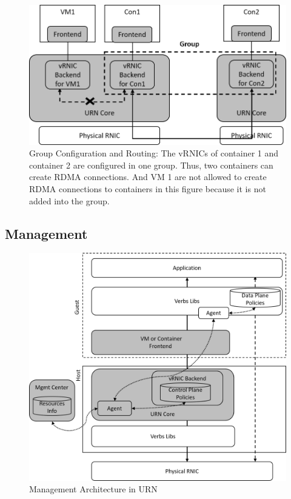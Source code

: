 \begin{figure}[!ht]
	\centering
	\includegraphics[width=1.0\linewidth]{images/route-config}
	\caption{Group Configuration and Routing: The vRNICs of container 1 and container 2 are configured in one group. Thus, two containers can create RDMA connections. And VM 1 are not allowed to create RDMA connections to containers in this figure because it is not added into the group. }
	\label{fig:route-config}
\end{figure}

\subsection{Management}

\begin{figure}[!ht]
	\centering
	\includegraphics[width=1\linewidth]{images/urn-interface.png}
	\caption{Management Architecture in URN}
	\label{fig:framework-overview}
\end{figure}

